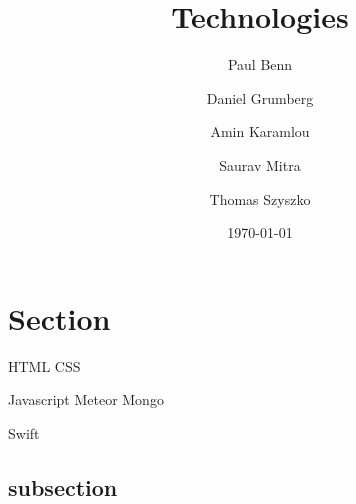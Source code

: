 \documentclass[a4wide, 11pt]{article}
\begin{document}
\title{Technologies}

\author{Paul Benn \and Daniel Grumberg \and Amin Karamlou \and Saurav Mitra \and Thomas Szyszko }

\date{\today}

\maketitle

\clearpage

\section{Section}

HTML
CSS

Javascript
Meteor
Mongo

Swift

\subsection{subsection} 
\end{document}
